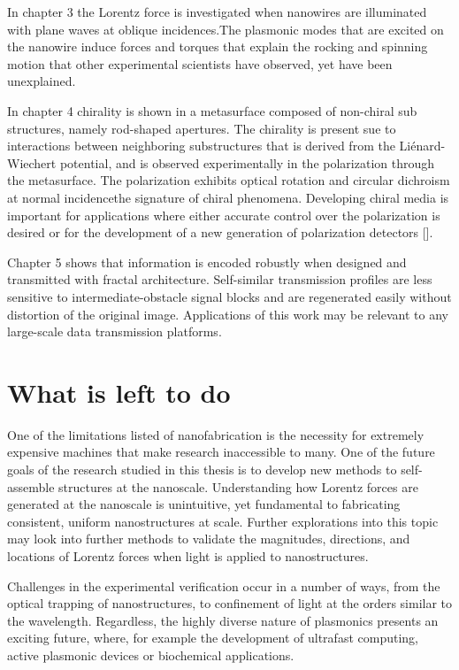 In chapter 3 the Lorentz force is investigated when nanowires are illuminated with plane waves at oblique incidences.The plasmonic modes that are excited on the nanowire induce forces and torques that explain the rocking and spinning motion that other experimental scientists have observed, yet have been unexplained.

In chapter 4 chirality is shown in a metasurface composed of non-chiral sub structures, namely rod-shaped apertures.  The chirality is present sue to interactions between neighboring substructures that is derived from the Li\'{e}nard-Wiechert potential, and is observed experimentally in the polarization through the metasurface. The polarization exhibits optical rotation and circular dichroism at normal incidence\textemdash the signature of chiral phenomena. Developing chiral media is important for applications where either accurate control over the polarization is desired or for the development of a new generation of polarization detectors [\cite{Mueller:16}].

Chapter 5 shows that information is encoded robustly when designed and transmitted with fractal architecture. Self-similar transmission profiles are less sensitive to intermediate-obstacle signal blocks and are regenerated easily without distortion of the original image. Applications of this work may be relevant to any large-scale data transmission platforms.


\section{What is left to do}
One of the limitations listed of nanofabrication is the necessity for extremely expensive machines that make research inaccessible to many. One of the future goals of the research studied in this thesis is to develop new methods to self-assemble structures at the nanoscale. Understanding how Lorentz forces are generated at the nanoscale is unintuitive, yet fundamental to fabricating consistent, uniform nanostructures at scale. Further explorations into this topic may look into further methods to validate the magnitudes, directions, and locations of Lorentz forces when light is applied to nanostructures. 

Challenges in the experimental verification occur in a number of ways, from the optical trapping of nanostructures, to confinement of light at the orders similar to the wavelength. Regardless, the highly diverse nature of plasmonics presents an exciting future, where, for example the development of ultrafast computing, active plasmonic devices or biochemical applications.

